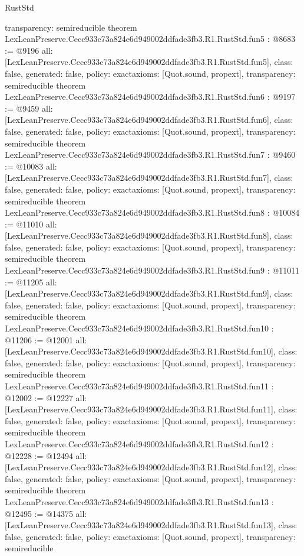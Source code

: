 \begin{lexlean}{RustStd}
\begin{coremodule}
{  transparency: semireducible
}
theorem LexLeanPreserve.Cecc933c73a824e6d949002ddfade3fb3.R1.RustStd.fun5 : @8683 := @9196 {
  all: [LexLeanPreserve.Cecc933c73a824e6d949002ddfade3fb3.R1.RustStd.fun5],
  class: false,
  generated: false,
  policy: exact{axioms: [Quot.sound, propext]},
  transparency: semireducible
}
theorem LexLeanPreserve.Cecc933c73a824e6d949002ddfade3fb3.R1.RustStd.fun6 : @9197 := @9459 {
  all: [LexLeanPreserve.Cecc933c73a824e6d949002ddfade3fb3.R1.RustStd.fun6],
  class: false,
  generated: false,
  policy: exact{axioms: [Quot.sound, propext]},
  transparency: semireducible
}
theorem LexLeanPreserve.Cecc933c73a824e6d949002ddfade3fb3.R1.RustStd.fun7 : @9460 := @10083 {
  all: [LexLeanPreserve.Cecc933c73a824e6d949002ddfade3fb3.R1.RustStd.fun7],
  class: false,
  generated: false,
  policy: exact{axioms: [Quot.sound, propext]},
  transparency: semireducible
}
theorem LexLeanPreserve.Cecc933c73a824e6d949002ddfade3fb3.R1.RustStd.fun8 : @10084 := @11010 {
  all: [LexLeanPreserve.Cecc933c73a824e6d949002ddfade3fb3.R1.RustStd.fun8],
  class: false,
  generated: false,
  policy: exact{axioms: [Quot.sound, propext]},
  transparency: semireducible
}
theorem LexLeanPreserve.Cecc933c73a824e6d949002ddfade3fb3.R1.RustStd.fun9 : @11011 := @11205 {
  all: [LexLeanPreserve.Cecc933c73a824e6d949002ddfade3fb3.R1.RustStd.fun9],
  class: false,
  generated: false,
  policy: exact{axioms: [Quot.sound, propext]},
  transparency: semireducible
}
theorem LexLeanPreserve.Cecc933c73a824e6d949002ddfade3fb3.R1.RustStd.fun10 : @11206 := @12001 {
  all: [LexLeanPreserve.Cecc933c73a824e6d949002ddfade3fb3.R1.RustStd.fun10],
  class: false,
  generated: false,
  policy: exact{axioms: [Quot.sound, propext]},
  transparency: semireducible
}
theorem LexLeanPreserve.Cecc933c73a824e6d949002ddfade3fb3.R1.RustStd.fun11 : @12002 := @12227 {
  all: [LexLeanPreserve.Cecc933c73a824e6d949002ddfade3fb3.R1.RustStd.fun11],
  class: false,
  generated: false,
  policy: exact{axioms: [Quot.sound, propext]},
  transparency: semireducible
}
theorem LexLeanPreserve.Cecc933c73a824e6d949002ddfade3fb3.R1.RustStd.fun12 : @12228 := @12494 {
  all: [LexLeanPreserve.Cecc933c73a824e6d949002ddfade3fb3.R1.RustStd.fun12],
  class: false,
  generated: false,
  policy: exact{axioms: [Quot.sound, propext]},
  transparency: semireducible
}
theorem LexLeanPreserve.Cecc933c73a824e6d949002ddfade3fb3.R1.RustStd.fun13 : @12495 := @14375 {
  all: [LexLeanPreserve.Cecc933c73a824e6d949002ddfade3fb3.R1.RustStd.fun13],
  class: false,
  generated: false,
  policy: exact{axioms: [Quot.sound, propext]},
  transparency: semireducible
}
\end{coremodule}
\end{lexlean}

